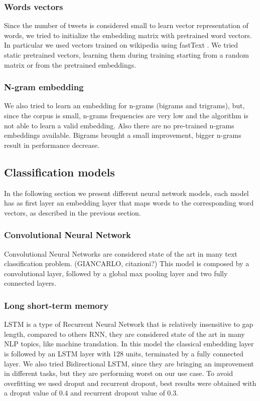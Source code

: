 \subsubsection{Words vectors}
Since the number of tweets is considered small to learn vector representation of words, we tried to initialize the embedding matrix with pretrained word vectors.
In particular we used vectors trained on wikipedia using fastText \cite{bojanowski2016enriching}.
We tried static pretrained vectors, learning them during training starting from a random matrix or from the pretrained embeddings.

\subsubsection{N-gram embedding}
We also tried to learn an embedding for n-grams (bigrams and trigrams), but, since the corpus is small, n-grams frequencies are very low and the algorithm is not able to learn a valid embedding.
Also there are no pre-trained n-grams embeddings available.
Bigrams brought a small improvement, bigger n-grams result in performance decrease.



\subsection{Classification models} \label{subsec:classificationModel}
In the following section we present different neural network models, each model has as first layer an embedding layer that maps words to the corresponding word vectors, as described in the previous section.


\subsubsection{Convolutional Neural Network}
Convolutional Neural Networks are considered state of the art in many text classification problem. (GIANCARLO, citazioni?)
This model is composed by a convolutional layer, followed by a global max pooling layer and two fully connected layers.

\subsubsection{Long short-term memory}
LSTM is a type of Recurrent Neural Network that is relatively insensitive to gap length, compared to others RNN, they are considered state of the art in many NLP topics, like machine translation.
In this model the classical embedding layer is followed by an LSTM layer with 128 units, terminated by a fully connected layer.
We also tried Bidirectional LSTM, since they are bringing an improvement in different tasks, but they are performing worst on our use case.
To avoid overfitting we used droput and recurrent dropout, best results were obtained with a droput value of 0.4 and recurrent dropout value of 0.3.

